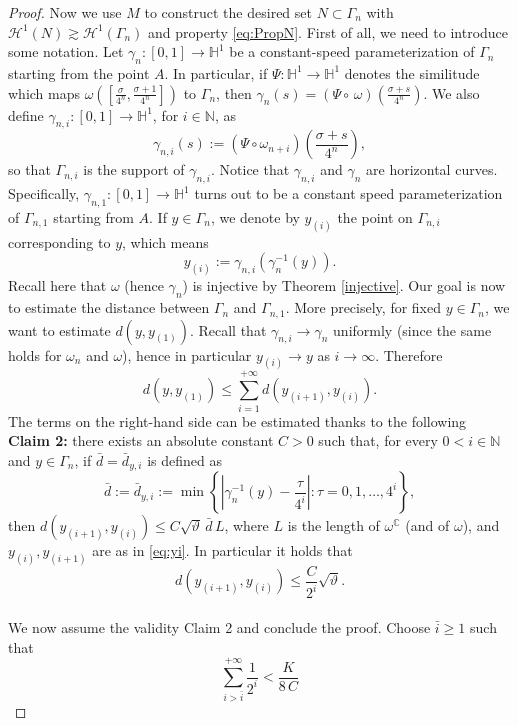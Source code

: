 \documentclass[12pt]{amsart}
\renewcommand{\H}{\mathbb H}
\newcommand{\N}{\mathbb N}
\renewcommand{\theta}{\vartheta}
\numberwithin{equation}{section}
\theoremstyle{plain}
\theoremstyle{definition}
\theoremstyle{remark}
\begin{document}
\begin{proof}
Now we use $M$ to construct the desired set $N\subset \Gamma_n$ with 
$\mathcal{H}^1(N)\gtrsim \mathcal{H}^1(\Gamma_n)$ and property
\eqref{eq:PropN}. 
First of all, we need to introduce some notation. Let $\gamma_n:[0,1]\to \H^1$ be a constant-speed parameterization of $\Gamma_n$ starting from the point $A$. In particular, if $\Psi:\H^1\to \H^1$ denotes the similitude which maps $\omega([\frac{\sigma}{4^n},\frac{\sigma+1}{4^n}])$ to $\Gamma_n$, then $\gamma_n(s)=(\Psi\circ\,\omega)(\frac{\sigma+s}{4^n})$. We also define $\gamma_{n,i}:[0,1]\to\H^1$, for $i\in\N$, as \[\gamma_{n,i}(s):=(\Psi\circ\omega_{n+i})\left(\frac{\sigma+s}{4^n}\right),\] so that $\Gamma_{n,i}$ is the support of $\gamma_{n,i}$.
Notice that $\gamma_{n,i}$ and $\gamma_n$ are horizontal curves. Specifically, $\gamma_{n,1}:[0,1]\to\H^1$ turns out to be a constant speed parameterization of $\Gamma_{n,1}$ starting from $A$. %
 If $y\in \Gamma_n$, we denote by $y_{(i)}$ the point on $\Gamma_{n,i}$ corresponding to $y$, which means 
 \begin{equation}\label{eq:yi}
 y_{(i)}:=\gamma_{n,i}(\gamma_n^{-1}(y)).\end{equation}
 Recall here that $\omega$ (hence $\gamma_n$) is injective by Theorem \ref{injective}.
 Our goal is now to estimate the distance between $\Gamma_n$ and $\Gamma_{n,1}$. More precisely, for fixed $y\in \Gamma_n$, we want to estimate $d(y,y_{(1)})$. Recall that $\gamma_{n,i}\to \gamma_n$ uniformly (since the same holds for $\omega_n$ and $\omega$), hence in particular $y_{(i)}\to y$ as $i\to\infty$. Therefore
 \[d(y, y_{(1)})\leq \sum_{i=1}^{+\infty}d(y_{(i+1)}, y_{(i)}).\]
 The terms on the right-hand side can be estimated thanks to the following\medskip \\
 \textbf{Claim 2:} there exists an absolute constant $C>0$ such that, for every $0<i\in\N$ and $y\in \Gamma_n$, if $\bar d=\bar d_{y,i}$ is defined as 
\begin{equation}\label{dbar}\bar d:=\bar d_{y,i}:=\min\left\{\left|\gamma_n^{-1}(y)-\frac{\tau}{4^i}\right|:\tau=0,1,\dots,4^i\right\},\end{equation}
 then $d(y_{(i+1)}, y_{(i)})\leq C\sqrt{\theta}\, \bar d\, L$, where $L$ is the length of $\omega^{\mathbb{C}}$ (and of $\omega$), and $y_{(i)},y_{(i+1)}$ are as in \eqref{eq:yi}.
In particular it holds that \[d(y_{(i+1)}, y_{(i)})\leq \frac{C}{2^i}\sqrt{\theta}.\]
\phantom{}\\ 
 We now assume the validity Claim 2 and conclude the proof. Choose $\bar i\geq 1$ such that \begin{equation}\label{eq:tail}\sum_{i>\bar i}^{+\infty}\frac{1}{2^i}<\frac{K}{8\,C}\end{equation}

\end{proof}
\end{document}
